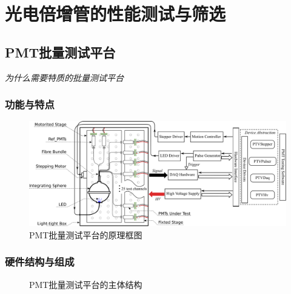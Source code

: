 \chapter{光电倍增管的性能测试与筛选}
\label{ch:pmt_test}

\section{PMT批量测试平台}
\label{sec:pmt_test:testbench}
\emph{为什么需要特质的批量测试平台}

\subsection{功能与特点}

\begin{figure}[htb]
	\centering
	\includegraphics[width=\textwidth]{chap/pmt_test/fig/testbench_schematic.eps}
	\caption{PMT批量测试平台的原理框图}
	\label{fig:pmt_test:testbench_schematic}
\end{figure}

\subsection{硬件结构与组成}

\begin{figure}[htbp]
	\centering
	\caption{PMT批量测试平台的主体结构}
	\label{fig:blindfigure}
\end{figure}

